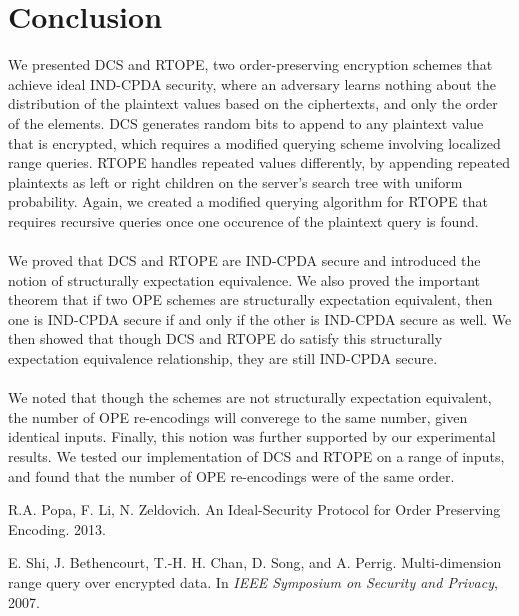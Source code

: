 \documentclass[12pt]{article}
\begin{document}
\section{Conclusion}
 We presented DCS and RTOPE, two order-preserving encryption schemes that achieve ideal IND-CPDA security, where an adversary learns nothing about the distribution of the plaintext values based on the ciphertexts, and only the order of the elements. DCS generates random bits to append to any plaintext value that is encrypted, which requires a modified querying scheme involving localized range queries. RTOPE handles repeated values differently, by appending repeated plaintexts as left or right children on the server's search tree with uniform probability. Again, we created a modified querying algorithm for RTOPE that requires recursive queries once one occurence of the plaintext query is found. \\ \\
We proved that DCS and RTOPE are IND-CPDA secure and introduced the notion of structurally expectation equivalence. We also proved the important theorem that if two OPE schemes are structurally expectation equivalent, then one is IND-CPDA secure if and only if the other is IND-CPDA secure as well. We then showed that though DCS and RTOPE do satisfy this structurally expectation equivalence relationship, they are still IND-CPDA secure. \\ \\
We noted that though the schemes are not structurally expectation equivalent, the number of OPE re-encodings will converege to the same number, given identical inputs. Finally, this notion was further supported by our experimental results. We tested our implementation of DCS and RTOPE on a range of inputs, and found that the number of OPE re-encodings were of the same order.
  
\begin{thebibliography}{9}

  R.A. Popa, F. Li, N. Zeldovich.
  An Ideal-Security Protocol for Order Preserving Encoding.
  2013.
  
  E. Shi, J. Bethencourt, T.-H. H. Chan, D. Song, and A. Perrig.
Multi-dimension range query over encrypted data. In \emph{IEEE
Symposium on Security and Privacy}, 2007.

\end{thebibliography}
  
\end{document}
